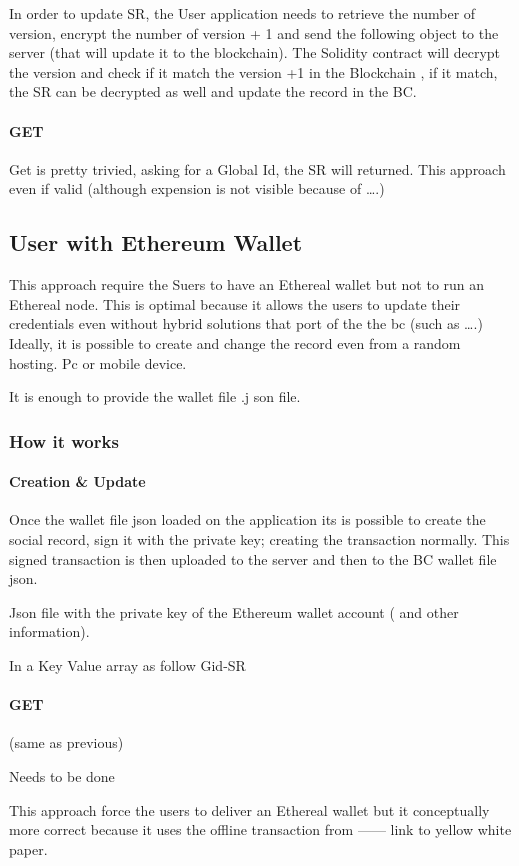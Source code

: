 In order to update SR, the User application needs to retrieve the number of version, encrypt the number of version + 1 and send the following object to the server (that will update it to the blockchain). The Solidity contract will decrypt the version and check if it match the version +1 in the Blockchain , if it match, the SR can be decrypted as well and update the record in the BC.

\paragraph{GET}

Get is pretty trivied, asking for a Global Id, the SR will returned. This approach even if valid (although expension is not visible because of ….)

\subsection{User with Ethereum Wallet}

This approach require the Suers to have an Ethereal wallet but not to run an Ethereal node.
This is optimal because it allows the users to update their credentials even without hybrid solutions that port of the the bc (such as ….) Ideally, it is possible to create and change the record even from a random hosting. Pc or mobile device.

It is enough to provide the wallet file .j son file.

\subsubsection{How it works}
\paragraph{Creation \& Update}

Once the wallet file json loaded on the application its is possible to create the social record, sign it with the private key; creating the transaction normally. This signed transaction is then uploaded to the server and then to the BC wallet file json.

Json file with the private key of the Ethereum wallet account ( and other information).

In a Key Value array as follow Gid-SR

\paragraph{GET}

(same as previous)
\begin{notation}

Needs to be done
\end{notation}

This approach force the users to deliver an Ethereal wallet but it conceptually more correct because it uses the offline transaction from —— link to yellow white paper.
